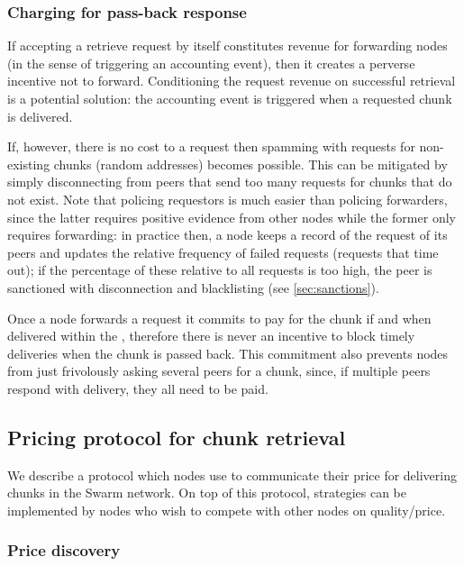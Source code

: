\subsubsection{Charging for pass-back response}

If accepting a retrieve request by itself constitutes revenue for forwarding nodes (in the sense of triggering an accounting event), then it creates a perverse incentive not to forward. Conditioning the request revenue on successful retrieval is a potential solution: the accounting event is triggered when a requested chunk is delivered.

If, however, there is no cost to a request then spamming with requests for non-existing chunks (random addresses) becomes possible. This can be mitigated by simply disconnecting from peers that send too many requests for chunks that do not exist. Note that policing requestors is much easier than policing forwarders, since the latter requires positive evidence from other nodes while the former only requires forwarding: in practice then, a node keeps a record of the request of its peers and updates the relative frequency of failed requests (requests that time out); if the percentage of these relative to all requests is too high, the peer is sanctioned with disconnection and blacklisting (see \ref{sec:sanctions}).

Once a node forwards a request it commits to pay for the chunk if and when delivered within the , therefore there is never an incentive to block timely deliveries when the chunk is passed back.  This commitment also prevents nodes from just frivolously asking several peers for a chunk, since, if  multiple peers respond with delivery, they all need to be paid. 


\subsection{Pricing protocol for chunk retrieval}\label{sec:pricing}

We describe a protocol which nodes use to communicate their price for delivering chunks in the Swarm network. On top of this protocol, strategies can be implemented by nodes who wish to compete with other nodes on quality/price. 

\subsubsection{Price discovery}

